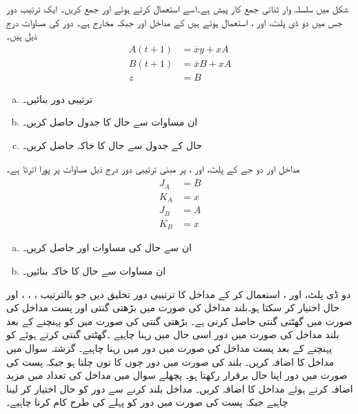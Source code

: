  شکل  میں سلسلہ وار ثنائی جمع کار  پیش ہے۔اسے استعمال کرتے ہوئے  اور    جمع کریں۔
ایک ترتیب دور جس میں دو ڈی پلٹ،   اور ،  استعمال ہوئے ہیں کے مداخل  اور   جبکہ مخارج  ہے۔ دور کی مساوات درج ذیل ہیں۔
\begin{align*}
A(t+1)&=\overline{x}y+xA\\
B(t+1)&=\overline{x}B+xA\\
z&=B
\end{align*}
\begin{enumerate}[a.]
\item
 ترتیبی دور  بنائیں۔ 
\item
  ان مساوات سے حال کا جدول حاصل کریں۔ 
\item
  حال  کے جدول سے حال کا خاکہ حاصل کریں۔
\end{enumerate}
 مداخل  اور دو جے کے پلٹ،   اور  ، پر مبنی ترتیبی دور درج ذیل مساوات   پر پورا اترتا ہے۔
 \begin{align*}
 J_A&=\overline{B}\\
 K_A&=x\\
 J_B&=A\\
 K_B&=x
 \end{align*}
 \begin{enumerate}[a.]
\item
ان سے حال کی مساوات   اور   حاصل کریں۔
\item 
ان  مساوات سے  حال کا خاکہ بنائیں۔
\end{enumerate}
 دو  ڈی پلٹ،  اور ، استعمال کر کے مداخل  کا   ترتیبی دور تخلیق دیں جو بالترتیب  ، ، ،  اور  حال اختیار کر سکتا ہو۔بلند  مداخل  کی صورت میں بڑھتی  گنتی   اور پست مداخل  کی صورت میں گھٹتی گنتی  حاصل کرنی ہے۔ بڑھتی گنتی کی صورت میں  کو  پہنچنے کے بعد بلند  مداخل  کی صورت میں  دور اسی حال میں رہنا چاہیے ۔گھٹتی گنتی کرتے ہوئے  کو پہنچنے کے بعد پست مداخل کی صورت میں دور  میں رہنا چاہیے۔
 گزشتہ سوال میں  مداخل   کا اضافہ کریں۔ بلند   کی صورت میں دور جوں کا توں چلتا ہو جبکہ پست  کی صورت میں  دور اپنا حال برقرار رکھتا ہو۔
 پچھلے سوال   میں  مداخل کی تعداد میں مزید اضافہ کرتے ہوئے مداخل   کا اضافہ کریں۔ مداخل   بلند کرنے سے دور کو حال  اختیار کر لینا چاہیے جبکہ پست   کی صورت میں دور  کو  پہلے کی طرح کام کرنا چاہیے۔
